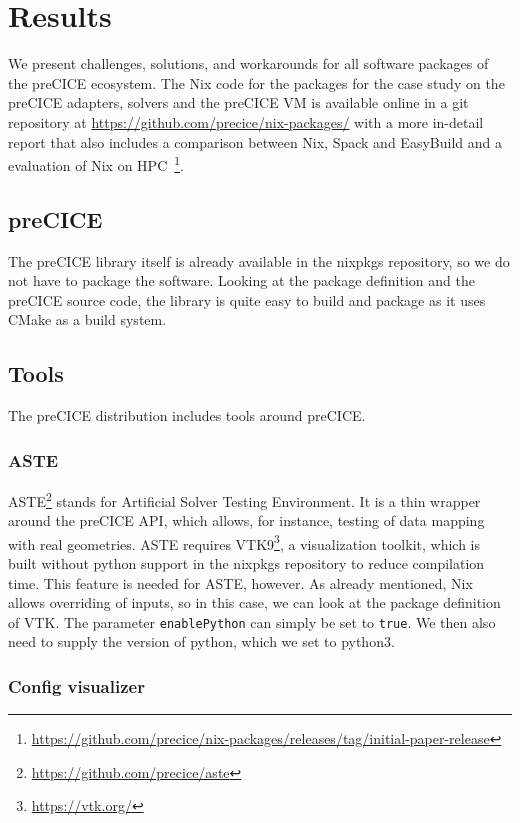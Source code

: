 \documentclass{eceasst}
\begin{document}
\section{Results}

We present challenges, solutions, and workarounds for all software packages of the preCICE ecosystem.
The Nix code for the packages for the case study on the preCICE adapters, solvers and the preCICE VM is available online in a git repository at \url{https://github.com/precice/nix-packages/} with a more in-detail report that also includes a comparison between Nix, Spack and EasyBuild and a evaluation of Nix on HPC~\footnote{\url{https://github.com/precice/nix-packages/releases/tag/initial-paper-release}}.

\subsection{preCICE}

The preCICE library itself is already available in the nixpkgs repository, so we do not have to package the software.
Looking at the package definition and the preCICE source code, the library is quite easy to build and package as it uses CMake as a build system.

\subsection{Tools}

The preCICE distribution includes tools around preCICE.

\subsubsection{ASTE}

ASTE\footnote{\url{https://github.com/precice/aste}} stands for Artificial Solver Testing Environment. It is a thin wrapper around the preCICE API, which allows, for instance, testing of data mapping with real geometries.
ASTE requires VTK9\footnote{\url{https://vtk.org/}}, a visualization toolkit, which is built without python support in the nixpkgs repository to reduce compilation time.
This feature is needed for ASTE, however.
As already mentioned, Nix allows overriding of inputs, so in this case, we can look at the package definition of VTK.
The parameter \texttt{enablePython} can simply be set to \texttt{true}. We then also need to supply the version of python, which we set to python3.

\subsubsection{Config visualizer}
\end{document}
